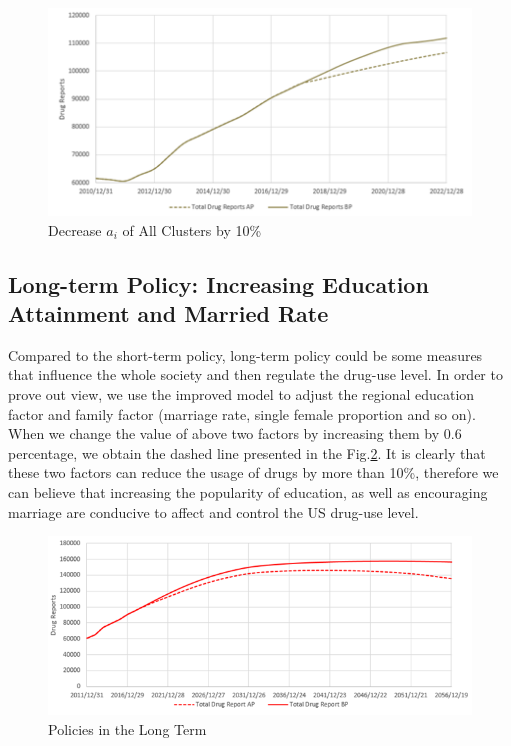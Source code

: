 \documentclass[12pt]{article}
\begin{document}
\begin{figure}[H]
	\centering
	\includegraphics[scale=0.9]{./figures/16.png}
	\caption{Decrease $a_{i}$ of All Clusters by 10\%}
	\label{Fig16}
\end{figure}

\subsection{Long-term Policy: Increasing Education Attainment and Married Rate}
Compared to the short-term policy, long-term policy could be some measures that influence the whole society and then regulate the drug-use level. In order to prove out view, we use the improved model to adjust the regional education factor and family factor (marriage rate, single female proportion and so on). When we change the value of above two factors by increasing them by 0.6 percentage, we obtain the dashed line presented in the Fig.\ref{Fig17}. It is clearly that these two factors can reduce the usage of drugs by more than 10\%, therefore we can believe that increasing the popularity of education, as well as encouraging marriage are conducive to affect and control the US drug-use level.
\begin{figure}[H]
	\centering
	\includegraphics[scale=0.7]{./figures/17.png}
	\caption{Policies in the Long Term}
	\label{Fig17}
\end{figure}
\end{document}
